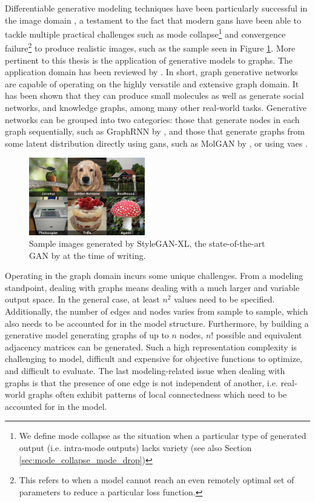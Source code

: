 Differentiable generative modeling techniques have been particularly successful
in the image domain \citep{sauer2022stylegan, ramesh2022hierarchical,
saharia2022hierarchical}, a testament to the fact that modern \acrfull{gans}
have been able to tackle multiple practical challenges such as mode
collapse\footnote{We define mode collapse as the situation when a particular
type of generated output (i.e. intra-mode outputs) lacks variety (see also
Section \ref{sec:mode_collapse_mode_drop})} and convergence
failure\footnote{This refers to when a model cannot reach an even remotely
optimal set of parameters to reduce a particular loss function.} to produce
realistic images, such as the sample seen in Figure \ref{fig:styleganxl}. More
pertinent to this thesis is the application of generative models to graphs. The
application domain has been reviewed by \cite{zhou2020graph}. In short, graph
generative networks are capable of operating on the highly versatile and
extensive graph domain. It has been shown that they can produce small molecules
as well as generate social networks, and knowledge graphs, among many other
real-world tasks. Generative networks can be grouped into two categories: those
that generate nodes in each graph sequentially, such as GraphRNN by
\cite{you2018graphrnn}, and those that generate graphs from some latent
distribution directly using \acrshort{gans}, such as MolGAN by
\cite{de2018molgan}, or using \acrshort{vaes} \citep{grover2019graphite}.

\begin{figure}
  \centering
  \includegraphics[width=0.45\textwidth]{./figures/representative_image.jpg}
  \caption[Sample images generated by StyleGAN-XL]{Sample images generated by StyleGAN-XL, the state-of-the-art GAN
by \cite{sauer2022stylegan} at the time of writing.}
  \label{fig:styleganxl}
\end{figure}

Operating in the graph domain incurs some unique challenges. From a modeling
standpoint, dealing with graphs means dealing with a much larger and variable
output space. In the general case, at least $n^2$ values need to be specified.
Additionally, the number of edges and nodes varies from sample to sample, which
also needs to be accounted for in the model structure. Furthermore, by building
a generative model generating graphs of up to $n$ nodes, $n!$ possible and
equivalent adjacency matrices can be generated. Such a high representation
complexity is challenging to model, difficult and expensive for objective
functions to optimize, and difficult to evaluate. The last modeling-related
issue when dealing with graphs is that the presence of one edge is not
independent of another, i.e. real-world graphs often exhibit patterns of local
connectedness which need to be accounted for in the model.

